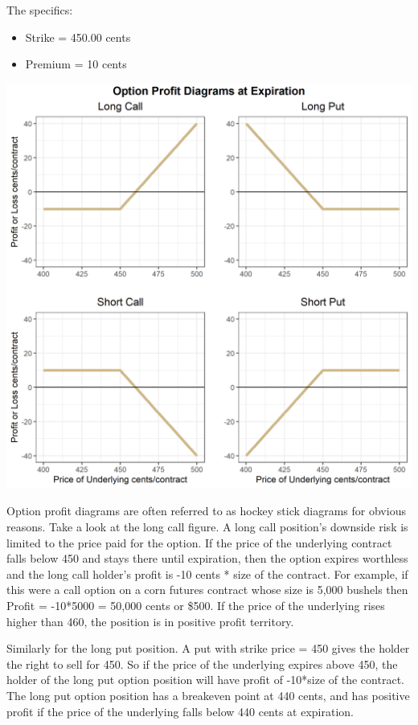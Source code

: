 \documentclass[
  letterpaper,
  DIV=11,
  numbers=noendperiod]{scrreprt}
\begin{document}
The specifics:

\begin{itemize}
\item
  Strike = 450.00 cents
\item
  Premium = 10 cents
\end{itemize}

\includegraphics{assets/Options1-optionplot.png}

Option profit diagrams are often referred to as hockey stick diagrams
for obvious reasons. Take a look at the long call figure. A long call
position's downside risk is limited to the price paid for the option. If
the price of the underlying contract falls below 450 and stays there
until expiration, then the option expires worthless and the long call
holder's profit is -10 cents * size of the contract. For example, if
this were a call option on a corn futures contract whose size is 5,000
bushels then Profit = -10*5000 = 50,000 cents or \$500. If the price of
the underlying rises higher than 460, the position is in positive profit
territory.

Similarly for the long put position. A put with strike price = 450 gives
the holder the right to sell for 450. So if the price of the underlying
expires above 450, the holder of the long put option position will have
profit of -10*size of the contract. The long put option position has a
breakeven point at 440 cents, and has positive profit if the price of
the underlying falls below 440 cents at expiration.
\end{document}
